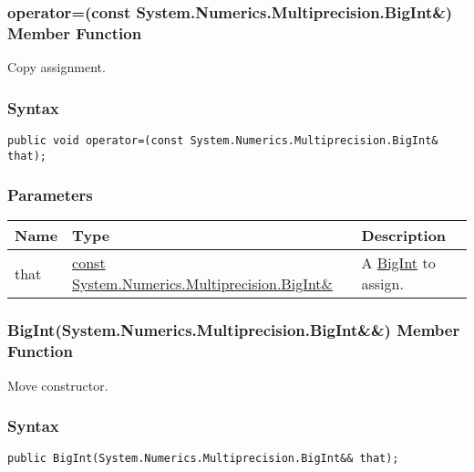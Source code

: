 \documentclass[a4paper,oneside,11.000000pt]{book}
\begin{document}
\hypertarget{System.Numerics.Multiprecision.BigInt.operator.assign.P.System.Numerics.Multiprecision.BigInt.C.R.System.Numerics.Multiprecision.BigInt}{\subsubsection*{operator=(const System.Numerics.Multiprecision.BigInt\&) Member Function}}\begin{flushleft}
Copy assignment.

\end{flushleft}
\subsubsection*{Syntax}
\texttt{public void operator=(const System.Numerics.Multiprecision.BigInt\& that);}
\subsubsection*{Parameters}
\begin{flushleft}
\begin{supertabular}[l]{!{\raggedright}p{1.30721cm}!{\raggedright}p{8.55945cm}!{\raggedright}p{4.6205cm}}
\textbf{Name}
& \textbf{Type}
& \textbf{Description}
\\
\hline
that
& \hyperlink{System.Numerics.Multiprecision.BigInt}{const System.\-Numerics.\-Multiprecision.\-BigInt\&\-}
& A \hyperlink{System.Numerics.Multiprecision.BigInt}{BigInt} to assign.

\\
\end{supertabular}

\end{flushleft}
\clearpage

\hypertarget{System.Numerics.Multiprecision.BigInt.constructor.P.System.Numerics.Multiprecision.BigInt.RR.System.Numerics.Multiprecision.BigInt}{\subsubsection*{BigInt(System.Numerics.Multiprecision.BigInt\&\&) Member Function}}\begin{flushleft}
Move constructor.

\end{flushleft}
\subsubsection*{Syntax}
\texttt{public BigInt(System.Numerics.Multiprecision.BigInt\&\& that);}
\end{document}
